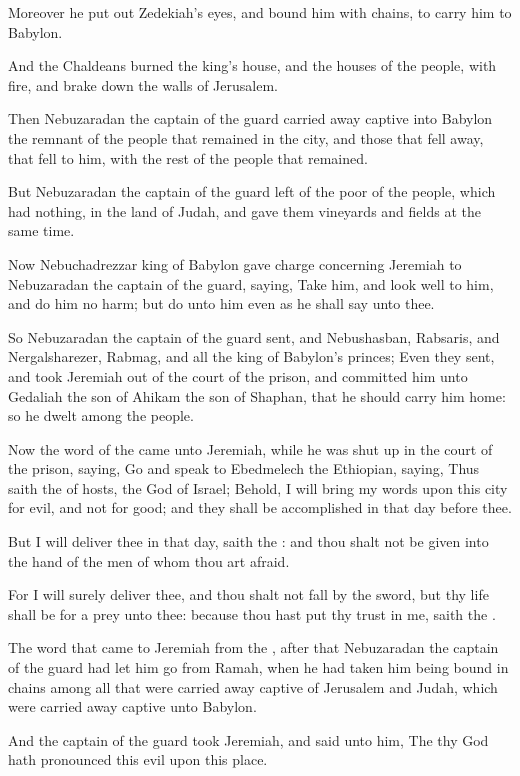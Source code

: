 \Verse Moreover he put out Zedekiah's eyes, and bound him with chains, to carry him to Babylon.

\Verse And the Chaldeans burned the king's house, and the houses of the people, with fire, and brake down the walls of Jerusalem.

\Verse Then Nebuzaradan the captain of the guard carried away captive into Babylon the remnant of the people that remained in the city, and those that fell away, that fell to him, with the rest of the people that remained.

\Verse But Nebuzaradan the captain of the guard left of the poor of the people, which had nothing, in the land of Judah, and gave them vineyards and fields at the same time.

\Verse Now Nebuchadrezzar king of Babylon gave charge concerning Jeremiah to Nebuzaradan the captain of the guard, saying, \Verse Take him, and look well to him, and do him no harm; but do unto him even as he shall say unto thee.

\Verse So Nebuzaradan the captain of the guard sent, and Nebushasban, Rabsaris, and Nergalsharezer, Rabmag, and all the king of Babylon's princes; \Verse Even they sent, and took Jeremiah out of the court of the prison, and committed him unto Gedaliah the son of Ahikam the son of Shaphan, that he should carry him home: so he dwelt among the people.

\Verse Now the word of the \LORD came unto Jeremiah, while he was shut up in the court of the prison, saying, \Verse Go and speak to Ebedmelech the Ethiopian, saying, Thus saith the \LORD of hosts, the God of Israel; Behold, I will bring my words upon this city for evil, and not for good; and they shall be accomplished in that day before thee.

\Verse But I will deliver thee in that day, saith the \LORD: and thou shalt not be given into the hand of the men of whom thou art afraid.

\Verse For I will surely deliver thee, and thou shalt not fall by the sword, but thy life shall be for a prey unto thee: because thou hast put thy trust in me, saith the \LORD.


\Chapter
\Verse The word that came to Jeremiah from the \LORD, after that Nebuzaradan the captain of the guard had let him go from Ramah, when he had taken him being bound in chains among all that were carried away captive of Jerusalem and Judah, which were carried away captive unto Babylon.

\Verse And the captain of the guard took Jeremiah, and said unto him, The \LORD thy God hath pronounced this evil upon this place.

